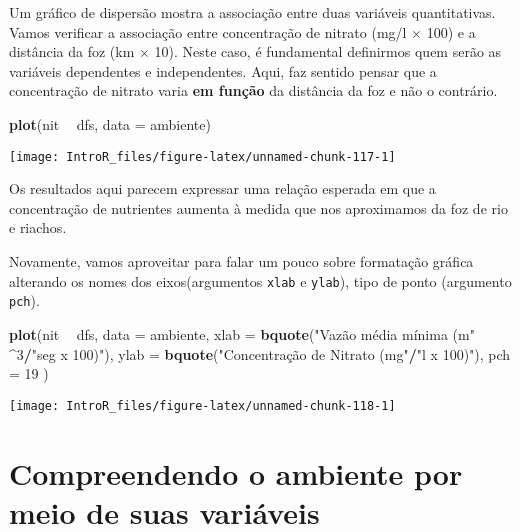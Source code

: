 \documentclass[
]{book}
\newenvironment{Shaded}{\begin{snugshade}}{\end{snugshade}}
\newcommand{\DataTypeTok}[1]{\textcolor[rgb]{0.13,0.29,0.53}{#1}}
\newcommand{\DecValTok}[1]{\textcolor[rgb]{0.00,0.00,0.81}{#1}}
\newcommand{\KeywordTok}[1]{\textcolor[rgb]{0.13,0.29,0.53}{\textbf{#1}}}
\newcommand{\NormalTok}[1]{#1}
\newcommand{\OperatorTok}[1]{\textcolor[rgb]{0.81,0.36,0.00}{\textbf{#1}}}
\newcommand{\StringTok}[1]{\textcolor[rgb]{0.31,0.60,0.02}{#1}}
\begin{document}
Um gráfico de dispersão mostra a associação entre duas variáveis quantitativas. Vamos verificar a associação entre concentração de nitrato (mg/l \(\times\) 100) e a distância da foz (km \(\times\) 10). Neste caso, é fundamental definirmos quem serão as variáveis dependentes e independentes. Aqui, faz sentido pensar que a concentração de nitrato varia \textbf{em função} da distância da foz e não o contrário.

\begin{Shaded}
\begin{Highlighting}[]
\KeywordTok{plot}\NormalTok{(nit }\OperatorTok{~}\StringTok{ }\NormalTok{dfs, }\DataTypeTok{data =}\NormalTok{ ambiente)}
\end{Highlighting}
\end{Shaded}

\begin{center}\texttt{[image: IntroR\_files/figure-latex/unnamed-chunk-117-1]} \end{center}

Os resultados aqui parecem expressar uma relação esperada em que a concentração de nutrientes aumenta à medida que nos aproximamos da foz de rio e riachos.

Novamente, vamos aproveitar para falar um pouco sobre formatação gráfica alterando os nomes dos eixos(argumentos \texttt{xlab} e \texttt{ylab}), tipo de ponto (argumento \texttt{pch}).

\begin{Shaded}
\begin{Highlighting}[]
\KeywordTok{plot}\NormalTok{(nit }\OperatorTok{~}\StringTok{ }\NormalTok{dfs, }\DataTypeTok{data =}\NormalTok{ ambiente,}
     \DataTypeTok{xlab =} \KeywordTok{bquote}\NormalTok{(}\StringTok{"Vazão média mínima (m"} \OperatorTok{^}\DecValTok{3}\OperatorTok{/}\StringTok{"seg x 100)"}\NormalTok{),}
     \DataTypeTok{ylab =} \KeywordTok{bquote}\NormalTok{(}\StringTok{"Concentração de Nitrato (mg"}\OperatorTok{/}\StringTok{"l x 100)"}\NormalTok{),}
     \DataTypeTok{pch =} \DecValTok{19}
\NormalTok{)}
\end{Highlighting}
\end{Shaded}

\begin{center}\texttt{[image: IntroR\_files/figure-latex/unnamed-chunk-118-1]} \end{center}

\hypertarget{compreendendo-o-ambiente-por-meio-de-suas-variuxe1veis}{%
\section{Compreendendo o ambiente por meio de suas variáveis}\label{compreendendo-o-ambiente-por-meio-de-suas-variuxe1veis}}
\end{document}

